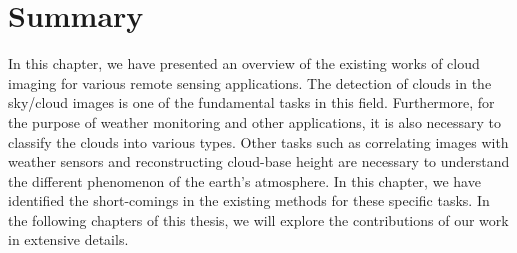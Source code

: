 \section{Summary}
In this chapter, we have presented an overview of the existing works of cloud imaging for various remote sensing applications. The detection of clouds in the sky/cloud images is one of the fundamental tasks in this field. Furthermore, for the purpose of weather monitoring and other applications, it is also necessary to classify the clouds into various types. Other tasks such as correlating images with weather sensors and reconstructing cloud-base height are necessary to understand the different phenomenon of the earth's atmosphere. In this chapter, we have identified the short-comings in the existing methods for these specific tasks. In the following chapters of this thesis, we will explore the contributions of our work in extensive details. 























